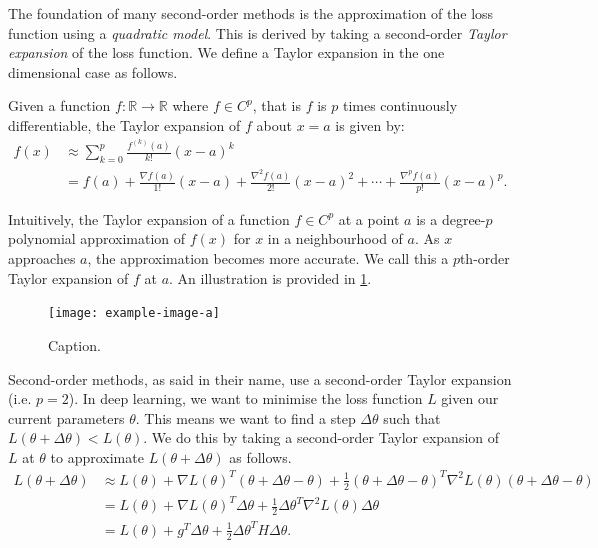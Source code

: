 The foundation of many second-order methods is the approximation of the loss function using a \textit{quadratic model}. This is derived by taking a second-order \textit{Taylor expansion} of the loss function. We define a Taylor expansion in the one dimensional case as follows.
\begin{definition}
    Given a function $f: \mathbb{R} \to \mathbb{R}$ where $f \in C^p$, that is $f$ is $p$ times continuously differentiable, the Taylor expansion of $f$ about $x = a$ is given by:
    \begin{align}
        f(x) 
        &\approx \sum_{k=0}^{p} \frac{f^{(k)}(a)}{k!} (x-a)^k \\
        &= f(a) + \frac{\nabla f(a)}{1!} (x-a) + \frac{\nabla^2 f(a)}{2!} (x-a)^2 + \cdots + \frac{\nabla^p f(a)}{p!} (x-a)^p.
    \end{align}
\end{definition}
Intuitively, the Taylor expansion of a function $f \in C^p$ at a point $a$ is a degree-$p$ polynomial approximation of $f(x)$ for $x$ in a neighbourhood of $a$. As $x$ approaches $a$, the approximation becomes more accurate. We call this a $p$th-order Taylor expansion of $f$ at $a$. An illustration is provided in \cref{fig:taylor_expansion}.

\begin{figure}[h]
    \centering
    \texttt{[image: example-image-a]}
    \caption{Caption.}
    \label{fig:taylor_expansion}
\end{figure}

Second-order methods, as said in their name, use a second-order Taylor expansion (i.e. $p = 2$). In deep learning, we want to minimise the loss function $L$ given our current parameters $\theta$. This means we want to find a step $\Delta \theta$ such that $L(\theta + \Delta \theta) < L(\theta)$. We do this by taking a second-order Taylor expansion of $L$ at $\theta$ to approximate $L(\theta + \Delta \theta)$ as follows.
\begin{align}
    L(\theta + \Delta \theta) &\approx L(\theta) + \nabla L(\theta)^T (\theta + \Delta \theta - \theta) + \frac{1}{2} (\theta + \Delta \theta - \theta)^T \nabla^2 L(\theta) (\theta + \Delta \theta - \theta) \\
    &= L(\theta) + \nabla L(\theta)^T \Delta \theta + \frac{1}{2} \Delta \theta^T \nabla^2 L(\theta) \Delta \theta \\
    &= L(\theta) + g^T \Delta \theta + \frac{1}{2} \Delta \theta^T H \Delta \theta.
\end{align}

